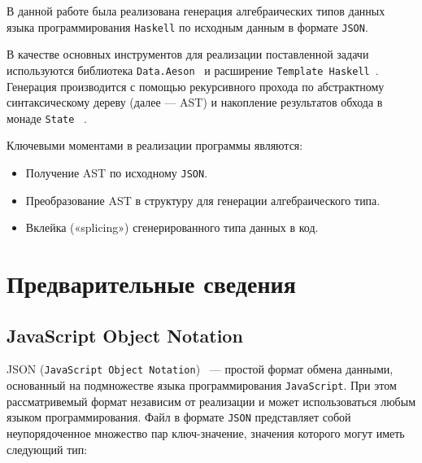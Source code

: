 


\graphicspath{ {img/} }




\Intro
В данной работе была реализована генерация алгебраических типов данных языка программирования \lstinline{Haskell} 
по исходным данным в формате \lstinline{JSON}.

В качестве основных инструментов для реализации поставленной задачи используются 
библиотека \lstinline{Data.Aeson}~\cite{aeson} и расширение \lstinline{Template Haskell}~\cite{tempHaskell}. Генерация 
производится с помощью рекурсивного прохода по абстрактному синтаксическому дереву (далее --- AST) и 
накопление результатов обхода в монаде \lstinline{State} ~\cite{stateM}.

Ключевыми моментами в реализации программы являются:

\begin{itemize}
  \item Получение AST по исходному \lstinline{JSON}.
  \item Преобразование AST в структуру для генерации алгебраического типа.
  \item Вклейка («splicing») сгенерированного типа данных в код.
\end{itemize}

\chapter{Предварительные сведения}

\section{JavaScript Object Notation}

JSON (\lstinline{JavaScript Object Notation})~\cite{jsonStandart} --- простой формат обмена данными, основанный на подмножестве языка программирования \lstinline{JavaScript}. При этом рассматривемый формат независим от реализации и может использоваться любым языком программирования. Файл в формате \lstinline{JSON} представляет собой неупорядоченное множество пар ключ-значение, значения которого могут иметь следующий тип:  

